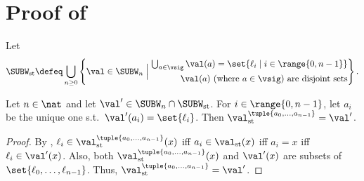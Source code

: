 
\section{Proof of }\label{section: theorem: ord for the standard language valuation}
\begin{definition}
       Let \[\SUBW_{\mathrm{st}} \defeq \bigcup_{n \ge 0} \left\{\val \in \SUBW_{n} \mathrel{\Big|}
              \begin{aligned}
                     \mbox{$\bigcup_{a \in \vsig} \val(a) = \set{\ell_{i} \mid i \in \range{0, n-1}}$} \\
                     \mbox{$\val(a)$ (where $a \in \vsig$) are disjoint sets}
              \end{aligned}
              \right\}.\]
\end{definition}

\begin{proposition}\label{proposition: st surjective}
Let $n \in \nat$ and let $\val' \in \SUBW_{n} \cap \SUBW_{\mathrm{st}}$.
For $i \in \range{0, n-1}$, let $a_i$ be the unique one s.t.\ $\val'(a_i) = \set{\ell_{i}}$.
Then $\val_{\mathrm{st}}^{\tuple{a_{0}, \dots, a_{n-1}}} = \val'$.
\end{proposition}
\begin{proof}
By ,
$\ell_{i} \in \val_{\mathrm{st}}^{\tuple{a_{0}, \dots, a_{n-1}}}(x)$ iff
$a_{i} \in \val_{\mathrm{st}}(x)$ iff $a_i = x$ iff
$\ell_{i} \in \val'(x)$.
Also, both $\val_{\mathrm{st}}^{\tuple{a_{0}, \dots, a_{n-1}}}(x)$ and $\val'(x)$ are subsets of $\set{\ell_{0}, \dots, \ell_{n-1}}$.
Thus, $\val_{\mathrm{st}}^{\tuple{a_{0}, \dots, a_{n-1}}} = \val'$.
\end{proof}

